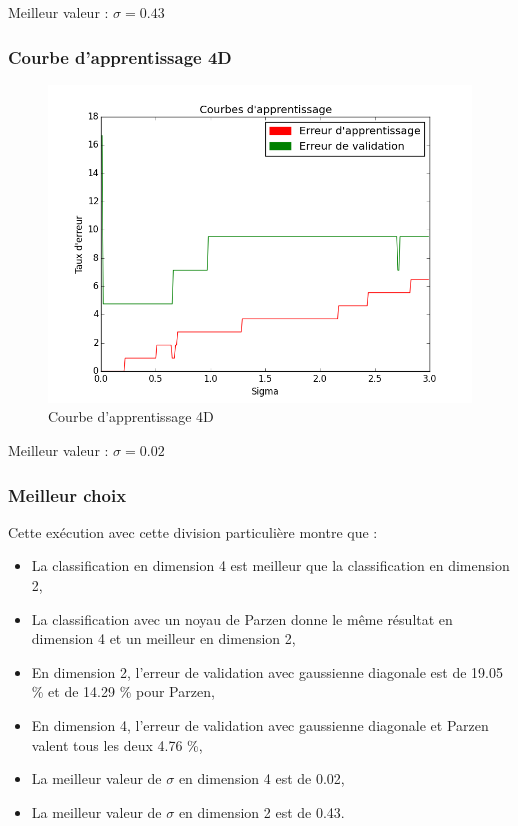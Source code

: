 \documentclass[a4paper,10pt]{article}
\begin{document}
Meilleur valeur : $\sigma = 0.43$

\subsubsection{Courbe d'apprentissage 4D}
\begin{figure}[H]
	\includegraphics[width=12cm]{images/bayes_parzen_courbe_apprentissage4D.png} 
	\centering
	\caption{Courbe d'apprentissage 4D}
	\label{fig:comp}
\end{figure}

Meilleur valeur : $\sigma = 0.02$

\subsubsection{Meilleur choix}
Cette exécution avec cette division particulière montre que :
\begin{itemize}
	\item La classification en dimension 4 est meilleur que la classification en dimension 2,
	\item La classification avec un noyau de Parzen donne le même résultat en dimension 4 et un meilleur en dimension 2,
	\item En dimension 2, l'erreur de validation avec gaussienne diagonale est de 19.05 \% et de 14.29 \% pour Parzen,
	\item En dimension 4, l'erreur de validation avec gaussienne diagonale et Parzen valent tous les deux 4.76 \%,
	\item La meilleur valeur de $\sigma$ en dimension 4 est de 0.02,
	\item La meilleur valeur de $\sigma$ en dimension 2 est de 0.43.
\end{itemize}
\vspace{5mm}
\end{document}
